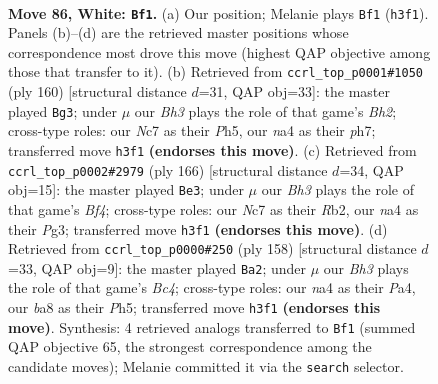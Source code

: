 \documentclass[11pt]{article}
\begin{document}
\clearpage

\begin{figure}[p]\centering
\begin{subfigure}{0.46\textwidth}\centering
\resizebox{\linewidth}{!}{%
\newchessgame
\chessboard[
  setfen={b7/2NR4/8/5Pk1/np4P1/7B/7P/6K1 w - - 0 86},
  showmover=false,
  pgfstyle=straightmove, color=movearrow, markmove={h3-f1}
]}
\caption{}
\end{subfigure}\hfill
\begin{subfigure}{0.46\textwidth}\centering
\resizebox{\linewidth}{!}{%
\newchessgame
\chessboard[
  setfen={5b2/7p/8/4Pp1P/4kP2/7K/7B/8 w - - 61 81},
  showmover=false,
  pgfstyle=straightmove, color=movearrow, markmove={h2-g3}
]}
\caption{}
\end{subfigure}
\\[4pt]
\begin{subfigure}{0.46\textwidth}\centering
\resizebox{\linewidth}{!}{%
\newchessgame
\chessboard[
  setfen={8/4r3/6kP/8/2b2Bp1/6P1/1R3K2/8 w - - 25 84},
  showmover=false,
  pgfstyle=straightmove, color=movearrow, markmove={f4-e3}
]}
\caption{}
\end{subfigure}\hfill
\begin{subfigure}{0.46\textwidth}\centering
\resizebox{\linewidth}{!}{%
\newchessgame
\chessboard[
  setfen={8/4bK2/1p1kP2p/7P/P1B5/8/8/8 w - - 9 80},
  showmover=false,
  pgfstyle=straightmove, color=movearrow, markmove={c4-a2}
]}
\caption{}
\end{subfigure}
\caption{\textbf{Move 86, White: \texttt{Bf1}.} (a) Our position; Melanie plays \texttt{Bf1} (\texttt{h3f1}). Panels (b)--(d) are the retrieved master positions whose correspondence most drove this move (highest QAP objective among those that transfer to it). (b) Retrieved from \texttt{ccrl\_top\_p0001\#1050} (ply 160) [structural distance $d$=31, QAP obj=33]: the master played \texttt{Bg3}; under $\mu$ our \emph{Bh3} plays the role of that game's \emph{Bh2}; cross-type roles: our \emph{N}c7 as their \emph{P}h5, our \emph{n}a4 as their \emph{p}h7; transferred move \texttt{h3f1} \textbf{(endorses this move)}. (c) Retrieved from \texttt{ccrl\_top\_p0002\#2979} (ply 166) [structural distance $d$=34, QAP obj=15]: the master played \texttt{Be3}; under $\mu$ our \emph{Bh3} plays the role of that game's \emph{Bf4}; cross-type roles: our \emph{N}c7 as their \emph{R}b2, our \emph{n}a4 as their \emph{P}g3; transferred move \texttt{h3f1} \textbf{(endorses this move)}. (d) Retrieved from \texttt{ccrl\_top\_p0000\#250} (ply 158) [structural distance $d$=33, QAP obj=9]: the master played \texttt{Ba2}; under $\mu$ our \emph{Bh3} plays the role of that game's \emph{Bc4}; cross-type roles: our \emph{n}a4 as their \emph{P}a4, our \emph{b}a8 as their \emph{P}h5; transferred move \texttt{h3f1} \textbf{(endorses this move)}. Synthesis: 4 retrieved analogs transferred to \texttt{Bf1} (summed QAP objective 65, the strongest correspondence among the candidate moves); Melanie committed it via the \texttt{search} selector.}
\label{fig:thought-m170}
\end{figure}
\end{document}
